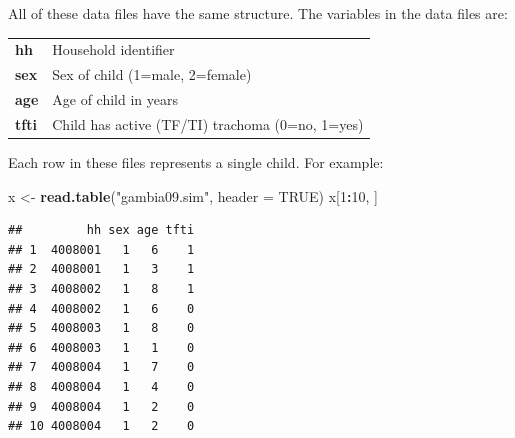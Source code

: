 \documentclass[12pt,a4paper]{book}
\newenvironment{Shaded}{\begin{snugshade}}{\end{snugshade}}
\newcommand{\DataTypeTok}[1]{\textcolor[rgb]{0.13,0.29,0.53}{#1}}
\newcommand{\DecValTok}[1]{\textcolor[rgb]{0.00,0.00,0.81}{#1}}
\newcommand{\KeywordTok}[1]{\textcolor[rgb]{0.13,0.29,0.53}{\textbf{#1}}}
\newcommand{\NormalTok}[1]{#1}
\newcommand{\OperatorTok}[1]{\textcolor[rgb]{0.81,0.36,0.00}{\textbf{#1}}}
\newcommand{\OtherTok}[1]{\textcolor[rgb]{0.56,0.35,0.01}{#1}}
\newcommand{\StringTok}[1]{\textcolor[rgb]{0.31,0.60,0.02}{#1}}
\theoremstyle{definition}
\theoremstyle{definition}
\theoremstyle{definition}
\theoremstyle{remark}
\begin{document}
All of these data files have the same structure. The variables in the
data files are:

\begin{longtable}[]{@{}ll@{}}
\toprule
\endhead
\begin{minipage}[t]{0.21\columnwidth}\raggedright
\textbf{hh}\strut
\end{minipage} & \begin{minipage}[t]{0.67\columnwidth}\raggedright
Household identifier\strut
\end{minipage}\tabularnewline
\begin{minipage}[t]{0.21\columnwidth}\raggedright
\textbf{sex}\strut
\end{minipage} & \begin{minipage}[t]{0.67\columnwidth}\raggedright
Sex of child (1=male, 2=female)\strut
\end{minipage}\tabularnewline
\begin{minipage}[t]{0.21\columnwidth}\raggedright
\textbf{age}\strut
\end{minipage} & \begin{minipage}[t]{0.67\columnwidth}\raggedright
Age of child in years\strut
\end{minipage}\tabularnewline
\begin{minipage}[t]{0.21\columnwidth}\raggedright
\textbf{tfti}\strut
\end{minipage} & \begin{minipage}[t]{0.67\columnwidth}\raggedright
Child has active (TF/TI) trachoma (0=no, 1=yes)\strut
\end{minipage}\tabularnewline
\bottomrule
\end{longtable}

Each row in these files represents a single child. For example:

\begin{Shaded}
\begin{Highlighting}[]
\NormalTok{x <-}\StringTok{ }\KeywordTok{read.table}\NormalTok{(}\StringTok{"gambia09.sim"}\NormalTok{, }\DataTypeTok{header =} \OtherTok{TRUE}\NormalTok{)}
\NormalTok{x[}\DecValTok{1}\OperatorTok{:}\DecValTok{10}\NormalTok{, ]}
\end{Highlighting}
\end{Shaded}

\begin{verbatim}
##         hh sex age tfti
## 1  4008001   1   6    1
## 2  4008001   1   3    1
## 3  4008002   1   8    1
## 4  4008002   1   6    0
## 5  4008003   1   8    0
## 6  4008003   1   1    0
## 7  4008004   1   7    0
## 8  4008004   1   4    0
## 9  4008004   1   2    0
## 10 4008004   1   2    0
\end{verbatim}
\end{document}
